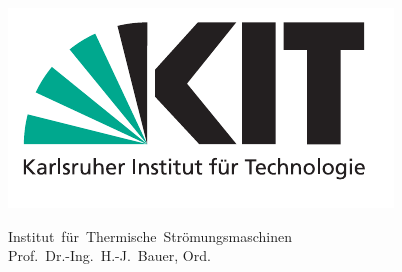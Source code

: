 \begin{titlepage}
{\begin{center}
		\vspace*{21cm}\hspace*{0cm}
		\includegraphics[scale=0.6]{sonstiges/kit_logo.pdf}		%
	\end{center}
	}
\parbox[t][22cm][t]{12cm}								%
{																			%
\begin{flushleft}
	\vspace*{-1.6cm}\hspace*{-1.7cm}			%
	\Large\sffamily
	\parbox[t][3.0cm][t]{13.5cm}
		{
			Institut~für~Thermische~Strömungsmaschinen\\
			\large Prof.~Dr.-Ing.~H.-J.~Bauer, Ord.~\\
		}

	\vspace{3.5cm}\hspace*{-1.7cm}					%
	\parbox[t][5cm][t]{13.5cm}								%
		{
			\LARGE 				
			\centering\bfseries\doctitle  
		}
			


\end{flushleft}}
\end{titlepage}
